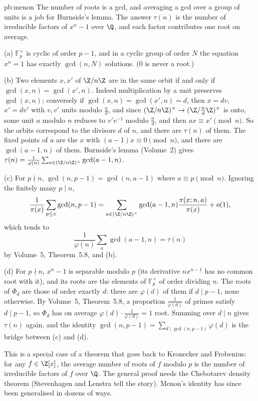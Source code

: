 \begin{solution}{pb:menon}
\idea The number of roots is a gcd, and averaging a gcd over a group of units is a job for Burnside's lemma. The answer $\tau(n)$ is the number of irreducible factors of $x^n-1$ over $\Q$,
and each factor contributes one root on average.

\writeup (a) $\mathbb F_p^\times$ is cyclic of order $p-1$, and in a cyclic group of order $N$ the equation $x^n=1$ has exactly $\gcd(n,N)$ solutions. ($0$ is never a root.)

(b) Two elements $x,x'$ of $\Z/n\Z$ are in the same orbit if and only if $\gcd(x,n)=\gcd(x',n)$. Indeed multiplication by a unit preserves $\gcd(x,n)$; conversely if
$\gcd(x,n)=\gcd(x',n)=d$, then $x=dv$, $x'=dv'$ with $v,v'$ units modulo $\frac nd$, and since $(\Z/n\Z)^\times\to(\Z/\frac nd\Z)^\times$ is onto, some unit $a$ modulo $n$
reduces to $v'v^{-1}$ modulo $\frac nd$, and then $ax\equiv x'\pmod n$. So the orbits correspond to the divisors $d$ of $n$, and there are $\tau(n)$ of them. The fixed points of $a$
are the $x$ with $(a-1)x\equiv0\pmod n$, and there are $\gcd(a-1,n)$ of them. Burnside's lemma (Volume~2) gives
$\tau(n)=\frac1{\varphi(n)}\sum_{a\in(\Z/n\Z)^\times}\gcd(a-1,n)$.

(c) For $p\nmid n$, $\gcd(n,p-1)=\gcd(n,a-1)$ where $a\equiv p\pmod n$. Ignoring the finitely many $p\mid n$,
\[
\frac1{\pi(x)}\sum_{p\le x}\gcd(n,p-1)=\sum_{a\in(\Z/n\Z)^\times}\gcd(a-1,n)\frac{\pi(x;n,a)}{\pi(x)}+o(1),
\]
which tends to
\[
\frac1{\varphi(n)}\sum_a\gcd(a-1,n)=\tau(n)
\]
by Volume~5, Theorem~5.8, and (b).

(d) For $p\nmid n$, $x^n-1$ is separable modulo $p$ (its derivative $nx^{n-1}$ has no common root with it), and its roots are the elements of $\mathbb F_p^\times$ of order dividing $n$.
The roots of $\Phi_d$ are those of order exactly $d$: there are $\varphi(d)$ of them if $d\mid p-1$, none otherwise. By Volume~5, Theorem~5.8, a proportion $\frac1{\varphi(d)}$ of primes satisfy
$d\mid p-1$, so $\Phi_d$ has on average $\varphi(d)\cdot\frac1{\varphi(d)}=1$ root. Summing over $d\mid n$ gives $\tau(n)$ again, and the identity
$\gcd(n,p-1)=\sum_{d\mid\gcd(n,p-1)}\varphi(d)$ is the bridge between (c) and (d).

\leads This is a special case of a theorem that goes back to Kronecker and Frobenius: for any $f\in\Z[x]$, the average number of roots of $f$ modulo $p$ is the number of irreducible factors of
$f$ over $\Q$. The general proof needs the Chebotarev density theorem (Stevenhagen and Lenstra tell the story). Menon's identity has since been generalised in dozens of ways.
\end{solution}

